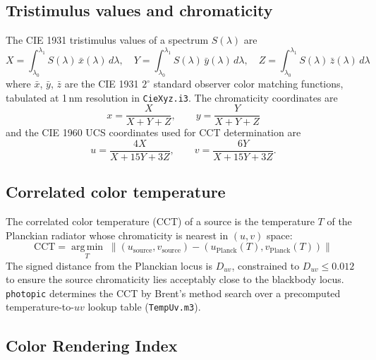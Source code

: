 \documentclass[11pt]{article}
\newcommand{\photopic}{\texttt{photopic}}
\newcommand{\file}[1]{\texttt{#1}}
\begin{document}
\subsection{Tristimulus values and chromaticity}

The CIE 1931 tristimulus values of a spectrum $S(\lambda)$ are
\begin{equation}
  X = \int_{\lambda_0}^{\lambda_1} S(\lambda)\, \bar{x}(\lambda)\, d\lambda, \quad
  Y = \int_{\lambda_0}^{\lambda_1} S(\lambda)\, \bar{y}(\lambda)\, d\lambda, \quad
  Z = \int_{\lambda_0}^{\lambda_1} S(\lambda)\, \bar{z}(\lambda)\, d\lambda
  \label{eq:tristimulus}
\end{equation}
where $\bar{x}$, $\bar{y}$, $\bar{z}$ are the CIE 1931 $2^\circ$
standard observer color matching functions, tabulated at 1\,nm
resolution in \file{CieXyz.i3}.  The chromaticity coordinates are
\begin{equation}
  x = \frac{X}{X+Y+Z}, \qquad y = \frac{Y}{X+Y+Z}
\end{equation}
and the CIE 1960 UCS coordinates used for CCT determination are
\begin{equation}
  u = \frac{4X}{X + 15Y + 3Z}, \qquad
  v = \frac{6Y}{X + 15Y + 3Z}.
  \label{eq:ucs}
\end{equation}

\subsection{Correlated color temperature}

The correlated color temperature (CCT) of a source is the temperature
$T$ of the Planckian radiator whose chromaticity is nearest in
$(u,v)$ space:
\begin{equation}
  \text{CCT} = \operatorname*{arg\,min}_{T} \;
    \bigl\lVert (u_{\text{source}}, v_{\text{source}})
    - (u_{\text{Planck}}(T), v_{\text{Planck}}(T)) \bigr\rVert
  \label{eq:cct}
\end{equation}
The signed distance from the Planckian locus is $D_{uv}$, constrained
to $D_{uv} \leq 0.012$ to ensure the source chromaticity lies
acceptably close to the blackbody locus.  \photopic{} determines the
CCT by Brent's method search over a precomputed temperature-to-$uv$
lookup table (\file{TempUv.m3}).

\subsection{Color Rendering Index}
\end{document}
